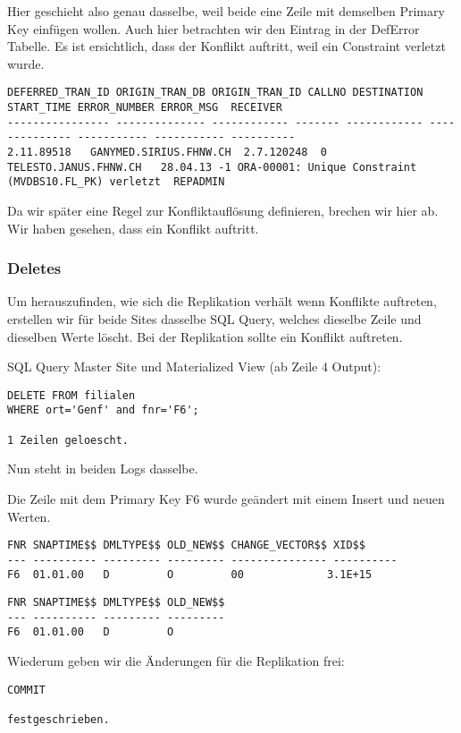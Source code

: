 \documentclass[11pt,a4paper,parskip=half]{scrartcl}
\begin{document}
Hier geschieht also genau dasselbe, weil beide eine Zeile mit demselben Primary Key einfügen wollen. Auch hier betrachten wir den Eintrag in der DefError Tabelle. Es ist ersichtlich, dass der Konflikt auftritt, weil ein Constraint verletzt wurde.
\begin{lstlisting}
DEFERRED_TRAN_ID ORIGIN_TRAN_DB ORIGIN_TRAN_ID CALLNO DESTINATION START_TIME ERROR_NUMBER ERROR_MSG  RECEIVER
---------------- -------------- ------------ ------- ------------ -------------- ----------- ----------- ----------
2.11.89518   GANYMED.SIRIUS.FHNW.CH  2.7.120248  0 TELESTO.JANUS.FHNW.CH   28.04.13 -1 ORA-00001: Unique Constraint (MVDBS10.FL_PK) verletzt  REPADMIN
\end{lstlisting}

Da wir später eine Regel zur Konfliktauflösung definieren, brechen wir hier ab. Wir haben gesehen, dass ein Konflikt auftritt.
\subsubsection{Deletes}
Um herauszufinden, wie sich die Replikation verhält wenn Konflikte auftreten, erstellen wir für beide Sites dasselbe SQL Query, welches dieselbe Zeile und dieselben Werte löscht. Bei der Replikation sollte ein Konflikt auftreten.

SQL Query Master Site und Materialized View (ab Zeile 4 Output):
\begin{lstlisting}
DELETE FROM filialen
WHERE ort='Genf' and fnr='F6'; 

1 Zeilen geloescht.
\end{lstlisting}

Nun steht in beiden Logs dasselbe.

Die Zeile mit dem Primary Key F6 wurde geändert mit einem Insert und neuen Werten.
\begin{lstlisting}
FNR SNAPTIME$$ DMLTYPE$$ OLD_NEW$$ CHANGE_VECTOR$$ XID$$
--- ---------- --------- --------- --------------- ----------
F6  01.01.00   D         O         00             3.1E+15 
\end{lstlisting}
\begin{lstlisting}
FNR SNAPTIME$$ DMLTYPE$$ OLD_NEW$$
--- ---------- --------- ---------
F6  01.01.00   D         O         
\end{lstlisting}

Wiederum geben wir die Änderungen für die Replikation frei:
\begin{lstlisting}
COMMIT

festgeschrieben.
\end{lstlisting}
\end{document}
